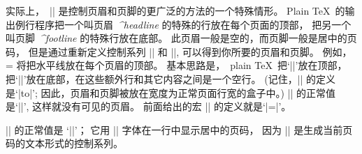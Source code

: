 \danger \1实际上，~|\nopagenumbers| 是控制页眉和页脚的更广泛的方法的一个特殊情形。%
Plain \TeX\ 的输出例行程序把一个叫{页眉}~{\sl^{headline}\/} 的特殊的行放在每个页面的顶部，
把另一个叫{页脚}~{\sl^{footline}\/} 的特殊行放在底部。%
此页眉一般是空的，而页脚一般是居中的页码，
但是通过重新定义控制系列 |\headline| 和 |\footline|, 可以得到你所要的页眉和页脚。%
例如，
\begintt
\headline={\hrulefill}
\endtt
将把水平线放在每个页眉的顶部。%
基本思路是，~plain \TeX\ 把`|\line{\the\headline}|'放在顶部，
把\allowbreak`|\line{\the\footline}|'放在底部，在这些额外行和其它内容之间是一个空行。%
(记住，|\line| 的定义是`|\hbox to\hsize|';
因此，页眉和页脚被放在宽度为正常页面行宽的盒子中。)
|\headline| 的正常值是`|\hfil|', 这样就没有可见的页眉。%
前面给出的宏 |\nopagenumbers| 的定义就是`|\footline={\hfil}|'。

\danger |\footline| 的正常值是 `|\hss\tenrm\folio\hss|'；
它用 |\tenrm| 字体在一行中显示居中的页码，
因为 |\folio| 是生成当前页码的文本形式的控制系列。

